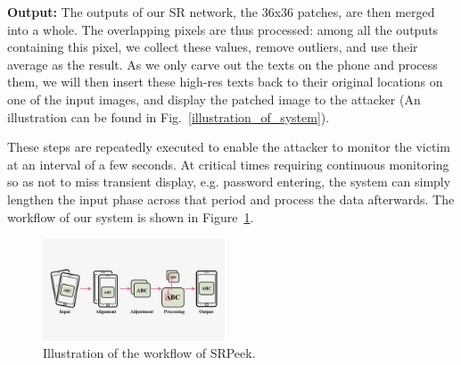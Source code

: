 \vspace{1mm}
\noindent
\textbf{Output:} The outputs of our SR network, the 36x36 patches, are then merged into a whole. The overlapping pixels are thus processed: among all the outputs containing this pixel, we collect these values, remove outliers, and use their average as the result. As we only carve out the texts on the phone and process them, we will then insert these high-res texts back to their original locations on one of the input images, and display the patched image to the attacker (An illustration can be found in Fig.~\ref{illustration_of_system}).

These steps are repeatedly executed to enable the attacker to monitor the victim at an interval of a few seconds. At critical times requiring continuous monitoring so as not to miss transient display, e.g. password entering, the system can simply lengthen the input phase across that period and process the data afterwards. The workflow of our system is shown in Figure~\ref{fig-workflow}.
\begin{figure}
  \centering
     \includegraphics[width=0.48\textwidth]{./pic/workflow_cl.pdf}
     \caption{Illustration of the workflow of \textsf{SRPeek}.}
     \label{fig-workflow}
\end{figure}


